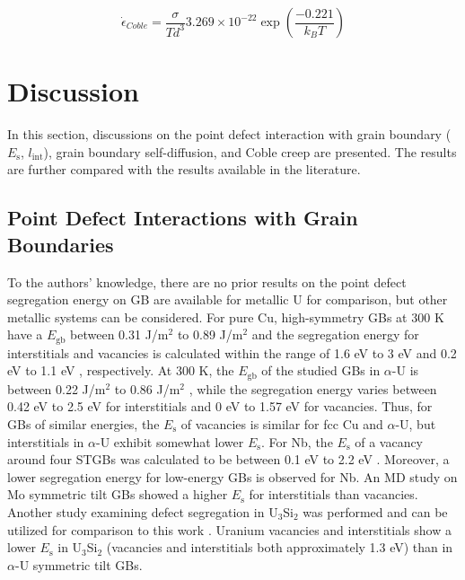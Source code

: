 \documentclass[review]{elsarticle}
\begin{document}
\begin{equation}
\label{eq:coble2}
\dot{\epsilon}_{Coble} =\frac{\sigma}{T d^{3}} 3.269 \times 10^{-22} \exp\left(\frac{-0.221}{k_{B} T}\right)
\end{equation}



\FloatBarrier

\section{Discussion}

In this section, discussions on the point defect interaction with grain boundary ($E_{\mathrm{s}}$, $l_{\mathrm{int}}$), grain boundary self-diffusion, and Coble creep are presented. The results are further compared with the results available in the literature. 

\subsection{Point Defect Interactions with Grain Boundaries}

To the authors' knowledge, there are no prior results on the point defect segregation energy on GB are available for metallic U for comparison, but other metallic systems can be considered. For pure Cu, high-symmetry GBs at 300 K \cite{bai_cu_inter, bai_cu_gb_with_interstitial_inter} have a  $E_{\mathrm{gb}}$  between 0.31 J/m${^2}$ to 0.89 J/m${^2}$ and the segregation energy for interstitials and vacancies is calculated within the range of 1.6 eV to 3 eV and 0.2 eV to 1.1 eV \cite{bai_cu_inter}, respectively. At 300 K, the  $E_{\mathrm{gb}}$  of the studied GBs in $\alpha$-U is between 0.22 J/m${^2}$ to 0.86 J/m${^2}$ \cite{MAHBUBA2021153072}, while the segregation energy varies between 0.42 eV to 2.5 eV for interstitials and 0 eV to 1.57 eV for vacancies. Thus, for GBs of similar energies, the $E_{\mathrm{s}}$ of vacancies is similar for fcc Cu and $\alpha$-U, but interstitials in $\alpha$-U exhibit somewhat lower $E_{\mathrm{s}}$. For Nb, the $E_{\mathrm{s}}$ of a vacancy around four STGBs was calculated to be between 0.1 eV to 2.2 eV \cite{Popov2022}. Moreover, a lower segregation energy for low-energy GBs is observed for Nb. An MD study on Mo symmetric tilt GBs showed a higher $E_{\mathrm{s}}$ for interstitials than vacancies\cite{Novoselov2014}. Another study examining defect segregation in U$_3$Si$_2$ was performed and can be utilized for comparison to this work \cite{beelerUSi}. Uranium vacancies and interstitials show a lower $E_{\mathrm{s}}$ in U$_\mathrm{3}$Si$_\mathrm{2}$ (vacancies and interstitials both approximately 1.3 eV) than in $\alpha$-U symmetric tilt GBs. 
\end{document}
